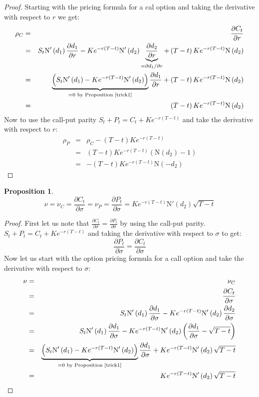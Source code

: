 \documentclass[11pt]{article}
\theoremstyle{definition}
\newtheorem{prop}{Proposition}[section]
\newcommand{\brac}[1]{\left(#1\right)}
\newcommand{\pardiff}[2]{\frac{\partial #1}{\partial #2}}
\newcommand{\normcdf}[1]{\text{N}\brac{#1}}
\newcommand{\normpdf}[1]{\text{N}'\brac{#1}}
\newcommand{\vega}{\nu}
\begin{document}
	\begin{proof}
		Starting with the pricing formula for a cal option and taking the derivative with respect to $r$ we get:
		\begin{eqnarray*}
			\rho_C &=& \pardiff{C_t}{r}\\
			&=& S_t\normpdf{d_1}\pardiff{d_1}{r} - Ke^{-r\brac{T-t}}\normpdf{d_2}\underbrace{\pardiff{d_2}{r}}_{=\partial d_1/\partial r} + \brac{T-t}Ke^{-r\brac{T-t}}\normcdf{d_2}\\
			&=& \underbrace{\brac{S_t\normpdf{d_1}-Ke^{-r\brac{T-t}}\normpdf{d_2}}}_{= 0 \text{ by Proposition \ref{trick1}}}\pardiff{d_1}{r} + \brac{T-t}Ke^{-r\brac{T-t}}\normcdf{d_2}\\
			&=& \brac{T-t}Ke^{-r\brac{T-t}}\normcdf{d_2}
		\end{eqnarray*}
		Now to use the call-put parity $S_t + P_t = C_t + Ke^{-r\brac{T-t}}$ and take the derivative with respect to $r$:
		\begin{eqnarray*}
			\rho_P &=& \rho_C - \brac{T-t}Ke^{-r\brac{T-t}}\\
			&=& \brac{T-t}Ke^{-r\brac{T-t}}\brac{\normcdf{d_2}-1}\\
			&=& -\brac{T-t}Ke^{-r\brac{T-t}}\normcdf{-d_2}
		\end{eqnarray*}
	\end{proof}
	\begin{prop}
		$$\vega = \vega_C = \pardiff{C_t}{\sigma} = \vega_P = \pardiff{P_t}{\sigma} = Ke^{-r\brac{T-t}}\normpdf{d_2}\sqrt{T-t}$$
	\end{prop}
	\begin{proof}
		First let us note that $\pardiff{C_t}{\sigma} = \pardiff{P_t}{\sigma}$ by using the call-put parity. $S_t + P_t = C_t + Ke^{-r\brac{T-t}}$ and taking the derivative with respect to $\sigma$ to get:
		$$\pardiff{P_t}{\sigma} = \pardiff{C_t}{\sigma}$$
		Now let us start with the option pricing formula for a call option and take the derivative with respect to $\sigma$:
		\begin{eqnarray*}
			\vega &=& \vega_C\\
			&=& \pardiff{C_t}{\sigma}\\
			&=& S_t\normpdf{d_1}\pardiff{d_1}{\sigma} - Ke^{-r\brac{T-t}}\normpdf{d_2}\pardiff{d_2}{\sigma}\\
			&=& S_t\normpdf{d_1}\pardiff{d_1}{\sigma} - Ke^{-r\brac{T-t}}\normpdf{d_2}\brac{\pardiff{d_1}{\sigma} - \sqrt{T-t}}\\
			&=& \underbrace{\brac{S_t\normpdf{d_1}-Ke^{-r\brac{T-t}}\normpdf{d_2}}}_{= 0 \text{ by Proposition \ref{trick1}}}\pardiff{d_1}{\sigma} + Ke^{-r\brac{T-t}}\normpdf{d_2}\sqrt{T-t}\\
			&=&Ke^{-r\brac{T-t}}\normpdf{d_2}\sqrt{T-t}
		\end{eqnarray*}
	\end{proof}
\end{document}

